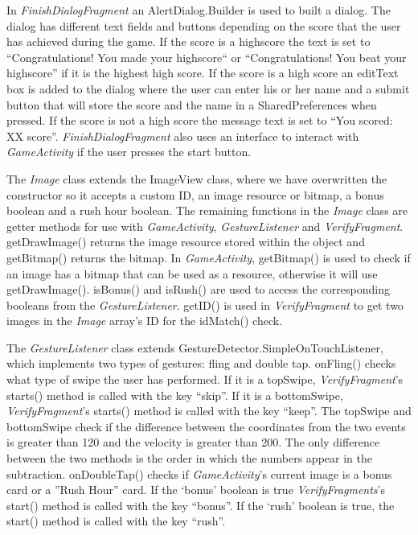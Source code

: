 In \emph{FinishDialogFragment} an AlertDialog.Builder is used to built a dialog. The dialog has different text fields and buttons depending on the score that the user has achieved during the game. If the score is a highscore the text is set to “Congratulations! You made your highscore“ or “Congratulations! You beat your highscore” if it is the highest high score. If the score is a high score an editText box is added to the dialog where the user can enter his or her name and a submit button that will store the score and the name in a SharedPreferences when pressed. If the score is not a high score the message text is set to “You scored: XX score”.
\emph{FinishDialogFragment} also uses an interface to interact with \emph{GameActivity} if the user presses the start button. \newline

The \emph{Image} class extends the ImageView class, where we have overwritten the constructor so it accepts a custom ID, an image resource or bitmap, a bonus boolean and a rush hour boolean. The remaining functions in the \emph{Image} class are getter methods for use with \emph{GameActivity}, \emph{GestureListener} and \emph{VerifyFragment}. getDrawImage() returns the image resource stored within the object and getBitmap() returns the bitmap. In \emph{GameActivity}, getBitmap() is used to check if an image has a bitmap that can be used as a resource, otherwise it will use getDrawImage(). isBonus() and isRush() are used to access the corresponding booleans from the \emph{GestureListener}. getID() is used in \emph{VerifyFragment} to get two images in the \emph{Image} array’s ID for the idMatch() check. \newline

The \emph{GestureListener} class extends GestureDetector.SimpleOnTouchListener, which implements two types of gestures: fling and double tap. onFling() checks what type of swipe the user has performed. If it is a topSwipe, \emph{VerifyFragment}'s starts() method is called with the key “skip”. If it is a bottomSwipe, \emph{VerifyFragment}'s starts() method is called with the key “keep”. The topSwipe and bottomSwipe check if the difference between the coordinates from the two events is greater than 120 and the velocity is greater than 200. The only difference between the two methods is the order in which the numbers appear in the subtraction. onDoubleTap() checks if \emph{GameActivity}’s current image is a bonus card or a ''Rush Hour'' card. If the `bonus' boolean is true \emph{VerifyFragments}'s start() method is called with the key “bonus”. If the `rush' boolean is true, the start() method is called with the key “rush”. \newline

